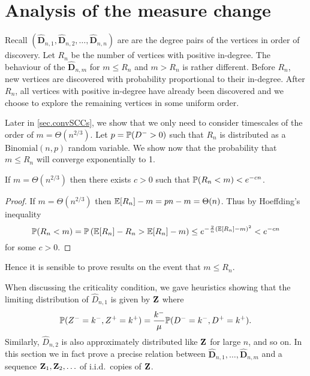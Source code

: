 \section{Analysis of the measure change}
\label{sec:measure-change}

Recall $(\mathbf{\widehat{D}}_{n, 1}, \mathbf{\widehat{D}}_{n, 2}, \ldots, \mathbf{\widehat{D}}_{n, n})$ are are the degree pairs of the vertices in order of discovery. Let $R_n$ be the number of vertices with positive in-degree. The behaviour of the $\mathbf{\widehat{D}}_{n, m}$ for $m \leq R_n$ and $m > R_n$ is rather different. Before $R_n$, new vertices are discovered with probability proportional to their in-degree. After $R_n$, all vertices with positive in-degree have already been discovered and we choose to explore the remaining vertices in some uniform order.

Later in \cref{sec.convSCCs}, we show that we only need to consider timescales of the order of $m = \Theta(n^{2/3})$. Let $p = \P(D^- > 0)$ such that $R_n$ is distributed as a $\text{Binomial}(n, p)$ random variable. We show now that the probability that $m \leq R_n$ will converge exponentially to 1.
\begin{lemma}
    If $m = \Theta(n^{2/3})$ then there exists $c > 0$ such that $\P(R_n < m) < e^{-c n}$.
\end{lemma}
\begin{proof}
    If $m = \Theta(n^{2/3})$ then $\E[R_n] - m = pn - m = \Theta(n)$. Thus by Hoeffding's inequality
    \begin{equation*}
        \P(R_n < m)
        = \P\left(\E[R_n] - R_n > \E[R_n] - m\right)
        \leq e^{-\frac{2}{n} (\E[R_n] - m)^2} < e^{-cn}
    \end{equation*}
    for some $c > 0$.
\end{proof}
Hence it is sensible to prove results on the event that $m \leq R_n$.

When discussing the criticality condition, we gave heuristics showing that the limiting distribution of $\widehat{D}_{n, 1}$ is given by $\vZ$ where
\begin{equation*}
    \P(Z^- = k^-, Z^+ = k^+) = \frac{k^-}{\mu}\P(D^- = k^-, D^+ = k^+).
\end{equation*}
Similarly, $\widehat{D}_{n, 2}$ is also approximately distributed like $\vZ$ for large $n$, and so on. In this section we in fact prove a precise relation between $\mathbf{\widehat{D}}_{n, 1}, \ldots, \mathbf{\widehat{D}}_{n, m}$ and a sequence $\vZ_1, \vZ_2, \ldots$ of i.i.d.\ copies of $\vZ$.

